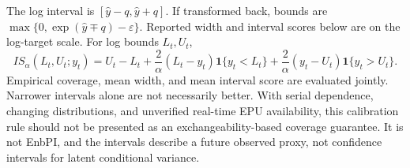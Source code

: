 The log interval is $[\widehat y-q,\widehat y+q]$. If transformed back, bounds are $\max\{0,\exp(\widehat y\mp q)-\varepsilon\}$. Reported width and interval scores below are on the log-target scale. For log bounds $L_t,U_t$,
\begin{equation}
IS_\alpha(L_t,U_t;y_t)=U_t-L_t+
\frac{2}{\alpha}(L_t-y_t)\mathbf1\{y_t<L_t\}+
\frac{2}{\alpha}(y_t-U_t)\mathbf1\{y_t>U_t\}.
\end{equation}
Empirical coverage, mean width, and mean interval score are evaluated jointly. Narrower intervals alone are not necessarily better. With serial dependence, changing distributions, and unverified real-time EPU availability, this calibration rule should not be presented as an exchangeability-based coverage guarantee. It is not EnbPI, and the intervals describe a future observed proxy, not confidence intervals for latent conditional variance.
